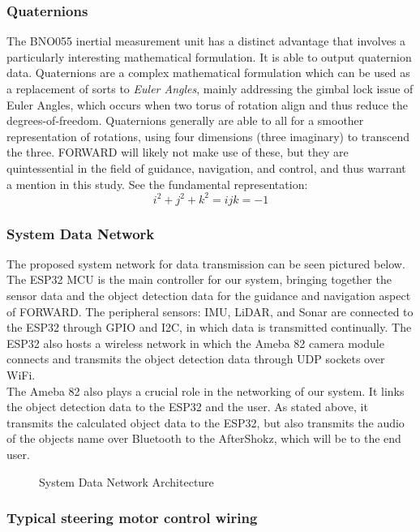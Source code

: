 \subsubsection{Quaternions}
\noindent The BNO055 inertial measurement unit has a distinct advantage that involves a particularly interesting mathematical formulation. It is able to output quaternion data. Quaternions are a complex mathematical formulation which can be used as a replacement of sorts to \textit{Euler Angles}, mainly addressing the gimbal lock issue of Euler Angles, which occurs when two torus of rotation align and thus reduce the degrees-of-freedom. Quaternions generally are able to all for a smoother representation of rotations, using four dimensions (three imaginary) to transcend the three. \cite{quat} FORWARD will likely not make use of these, but they are quintessential in the field of guidance, navigation, and control, and thus warrant a mention in this study. See the fundamental representation:\\
$$i^2+j^2+k^2=ijk=-1$$

\subsubsection{System Data Network}
\noindent The proposed system network for data transmission can be seen pictured below. The ESP32 MCU is the main controller for our system, bringing together the sensor data and the object detection data for the guidance and navigation aspect of FORWARD. The peripheral sensors: IMU, LiDAR, and Sonar are connected to the ESP32 through GPIO and I2C, in which data is transmitted continually. The ESP32 also hosts a wireless network in which the Ameba 82 camera module connects and transmits the object detection data through UDP sockets over WiFi. \\

\noindent The Ameba 82 also plays a crucial role in the networking of our system. It links the object detection data to the ESP32 and the user. As stated above, it transmits the calculated object data to the ESP32, but also transmits the audio of the objects name over Bluetooth to the AfterShokz, which will be to the end user. \\

\begin{figure}[H]
	\centering
	\caption{\label{fig:System_Network_Arch}System Data Network Architecture}
\end{figure}


\subsubsection{Typical steering motor control wiring}

